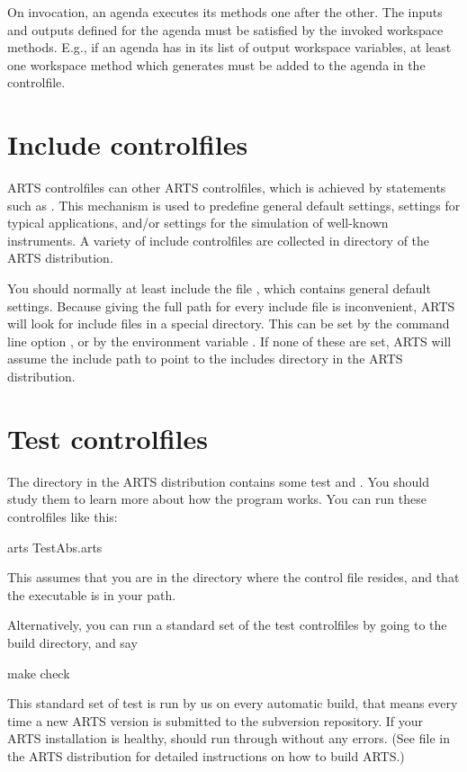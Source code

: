 On invocation, an agenda executes its methods one after the
other. The inputs and outputs defined for the agenda must be satisfied
by the invoked workspace methods. E.g., if an agenda has
 in its list of output workspace
variables, at least one workspace method which generates
 must be added to the agenda in the
controlfile.

\section{Include controlfiles}

ARTS controlfiles can \emph{} other ARTS
controlfiles, which is achieved by statements such as
.  This mechanism is used to
predefine general default settings, settings for typical applications,
and/or settings for the simulation of well-known instruments.  A
variety of include controlfiles are collected in directory
 of the ARTS distribution.

You should normally at least include the file , which
contains general default settings. Because giving the full path for every
include file is inconvenient, ARTS will look for include files in a special
directory. This can be set by the command line option , or by the environment variable
. If none of these are set, ARTS
will assume the include path to point to the includes directory in the ARTS
distribution. 


\section{Test controlfiles}

The directory  in the ARTS distribution contains some
test and .  You should study them to learn more about how
the program works. You can run these controlfiles like this:
\begin{code}
  arts TestAbs.arts
\end{code}
This assumes that you are in the directory where the control
file resides, and that the  executable is in
your path. 

Alternatively, you can run a standard set of the test controlfiles by
going to the build directory, and say
\begin{code}
  make check
\end{code}
This standard set of test is run by us on every automatic build, that
means every time a new ARTS version is submitted to the subversion
repository. If your ARTS installation is healthy,  should run through without any errors. (See file
 in the ARTS distribution for detailed instructions
on how to build ARTS.)\\



